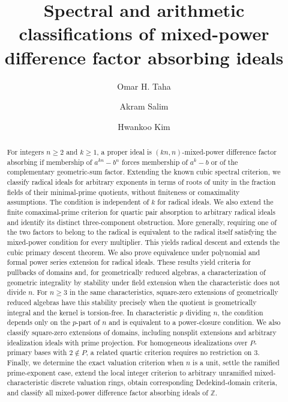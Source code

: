 \documentclass[11pt,a4paper]{amsart}
\title[Spectral and arithmetic classifications of mpdf ideals]
{Spectral and arithmetic classifications of mixed-power difference factor absorbing ideals}
\date{}
\theoremstyle{definition}
\theoremstyle{remark}
\numberwithin{equation}{section}
\begin{document}
\raggedbottom
\author{Omar H. Taha}
\address{Department of Mathematics, College of Computer Science and Mathematics, Tikrit University, Tikrit, Iraq.}

\author{Akram Salim}
\address{Department of Mathematics, College of Computer Science and Mathematics, Tikrit University, Tikrit, Iraq.}

\author{Hwankoo Kim}
\address{Division of Computer Engineering, Hoseo University, Republic of Korea.}

\begin{abstract}
For integers $n\ge2$ and $k\ge1$, a proper ideal is $(kn,n)$-mixed-power
difference factor absorbing if membership of $a^{kn}-b^n$ forces membership
of $a^k-b$ or of the complementary geometric-sum factor. Extending the
known cubic spectral criterion, we classify radical ideals for arbitrary
exponents in terms of roots of unity in the fraction fields of their
minimal-prime quotients, without finiteness or comaximality assumptions.
The condition is independent of $k$ for radical ideals. We also extend
the finite comaximal-prime criterion for quartic pair absorption to
arbitrary radical ideals and identify its distinct three-component
obstruction. More generally,
requiring one of the two factors to belong to the radical is equivalent
to the radical itself satisfying the mixed-power condition for every
multiplier. This yields radical descent and extends the cubic primary
descent theorem. We also prove equivalence under polynomial and formal
power series extension for radical ideals. These
results yield criteria for pullbacks of domains and, for geometrically
reduced algebras, a characterization of geometric integrality by stability
under field extension when the characteristic does not divide $n$.
For $n\ge3$ in the same characteristics, square-zero extensions of
geometrically reduced algebras have this stability precisely when the
quotient is geometrically integral and the kernel is torsion-free. In characteristic
$p$ dividing $n$, the condition depends only on the $p$-part of $n$ and is
equivalent to a power-closure condition. We also classify square-zero
extensions of domains, including nonsplit extensions and arbitrary
idealization ideals with prime projection. For homogeneous idealizations
over $P$-primary bases with $2\notin P$, a related quartic criterion
requires no restriction on $3$.
Finally, we determine the exact
valuation criterion when $n$ is a unit, settle the ramified prime-exponent
case, extend the local integer criterion to arbitrary unramified
mixed-characteristic discrete valuation rings, obtain corresponding Dedekind-domain criteria, and classify all
mixed-power difference factor absorbing ideals of $\mathbb Z$.
\end{abstract}
\maketitle
\end{document}
